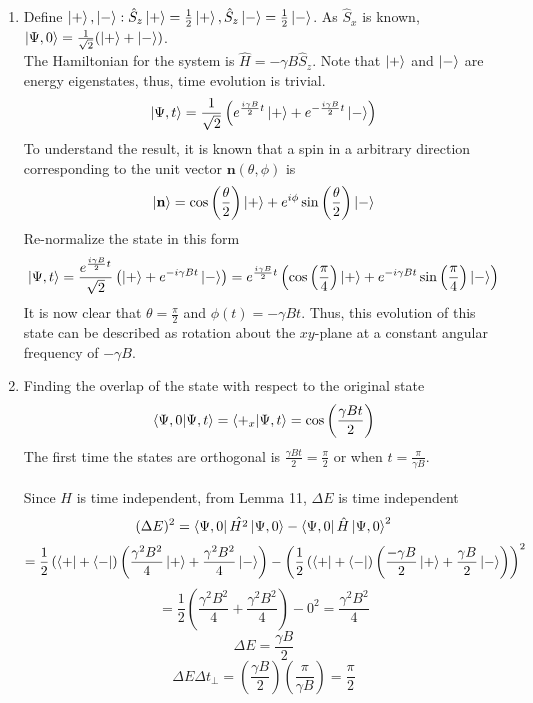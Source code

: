 \begin{sol}
\begin{enumerate}[label=\textbf{(\alph*)}]
\item
Define $\ket+,\ket-:\hat S_z\ket+=\frac{1}{2}\ket+,\hat S_z\ket-=\frac{1}{2}\ket-$. As $\hat S_x$ is known, $\ket{\Psi,0}=\frac{1}{\sqrt{2}}(\ket++\ket-)$.\\
The Hamiltonian for the system is $\hat H=-\gamma B\hat S_z$. Note that $\ket+$ and $\ket-$ are energy eigenstates, thus, time evolution is trivial.
$$\ket{\Psi,t}=\frac{1}{\sqrt{2}}\left(e^{\frac{i\gamma B}{2}t}\ket++e^{-\frac{i\gamma B}{2}t}\ket-\right)$$ 
To understand the result, it is known that a spin in a arbitrary direction corresponding to the unit vector $\mathbf n(\theta, \phi)$ is
$$\ket{\mathbf{n}}=\cos\left(\frac{\theta}{2}\right)\ket{+}+e^{i\phi}\sin\left(\frac{\theta}{2}\right)\ket{-}$$
Re-normalize the state in this form
$$\ket{\Psi,t}=\frac{e^{\frac{i\gamma B}{2}t}}{\sqrt{2}}\left(\ket++e^{-i\gamma Bt}\ket-\right)=e^{\frac{i\gamma B}{2}t}\left(\cos\Big(\frac{\pi}{4}\Big)\ket++e^{-i\gamma Bt}\sin\Big(\frac{\pi}{4}\Big)\ket-\right)$$
It is now clear that $\theta=\frac{\pi}{2}$ and $\phi(t)=-\gamma Bt$. Thus, this evolution of this state can be described as rotation about the $xy$-plane at a constant angular frequency of $-\gamma B$.

\item
Finding the overlap of the state with respect to the original state
$$\braket{\Psi,0}{\Psi,t}=\braket{+_x}{\Psi,t}=\cos\left(\frac{\gamma Bt}{2}\right)$$ 
The first time the states are orthogonal is $\displaystyle{\frac{\gamma Bt}{2}=\frac{\pi}{2}}$ or when $\displaystyle{t=\frac{\pi}{\gamma B}}$.\\\\
Since $H$ is time independent, from Lemma 11, $\Delta E$ is time independent
$$(\Delta E)^2=\bra{\Psi,0}\hat {H^2}\ket{\Psi,0}-\bra{\Psi,0}\hat H\ket{\Psi,0}^2$$
$$=\frac{1}{2}\left(\bra++\bra-\right)\left(\frac{\gamma^2 B^2}{4}\ket++\frac{\gamma^2 B^2}{4}\ket-\right)
-\left(\frac{1}{2}\left(\bra++\bra-\right)\left(\frac{-\gamma B}{2}\ket++\frac{\gamma B}{2}\ket-\right)\right)^2$$
$$=\frac{1}{2}\left(\frac{\gamma^2 B^2}{4}+\frac{\gamma^2 B^2}{4}\right)-0^2=\frac{\gamma^2 B^2}{4}$$ 
$$\Delta E=\frac{\gamma B}{2}$$ 
$$\Delta E\Delta t_\perp=\left(\frac{\gamma B}{2}\right)\left(\frac{\pi}{\gamma B}\right)=\frac{\pi}{2}$$ 

 \end{enumerate}
\end{sol}